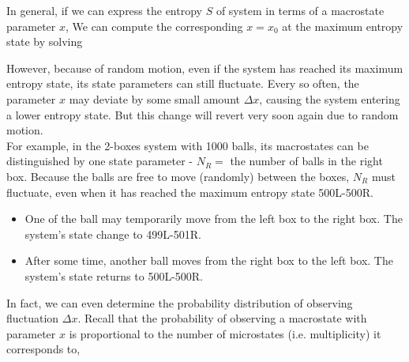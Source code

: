 \documentclass[class=article, crop=false, 12pt]{standalone}
\begin{document}
In general, if we can express the entropy $S$ of system in terms of a macrostate parameter $x$,
We can compute the corresponding $x=x_0$ at the maximum entropy state by solving

However, because of random motion, 
even if the system has reached its maximum entropy state,
its state parameters can still fluctuate.
Every so often, the parameter $x$ may deviate by some small amount $\Delta x$, 
causing the system entering a lower entropy state. 
But this change will revert very soon again due to random motion.\\

For example, in the 2-boxes system with 1000 balls, 
its macrostates can be distinguished by one state parameter - 
$N_R=$ the number of balls in the right box. 
Because the balls are free to move (randomly) between the boxes, 
$N_R$ must fluctuate, even when it has reached the maximum entropy state 500L-500R. 
\begin{itemize}
    \item
    One of the ball may temporarily move from the left box to the right box.
    The system's state change to 499L-501R. 

    \item After some time, another ball moves from the right box to the left box.
    The system's state returns to 500L-500R.
\end{itemize}



In fact, we can even determine the probability distribution of observing fluctuation $\Delta x$.
Recall that the probability of observing a macrostate with parameter $x$ 
is proportional to the number of microstates (i.e. multiplicity) it corresponds to,
\end{document}
